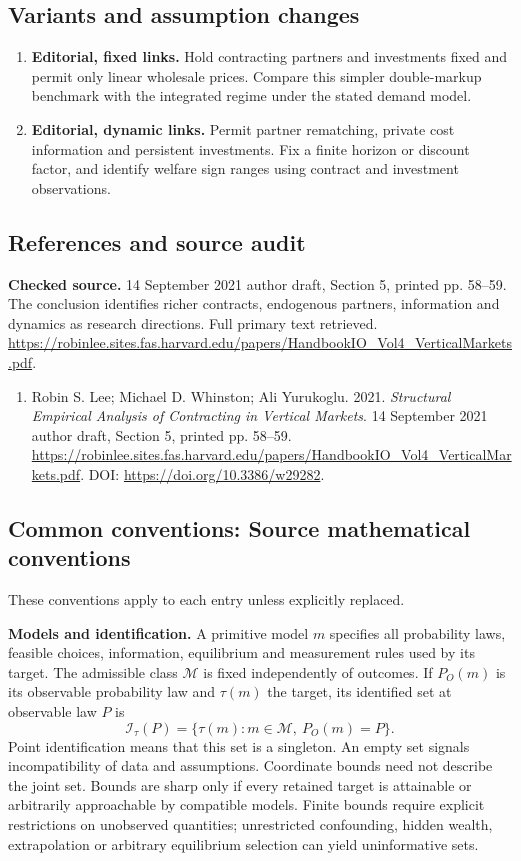 \documentclass[11pt,a4paper]{article}
\begin{document}
\subsection*{Variants and assumption changes}
\begin{enumerate}
\item \textbf{Editorial, fixed links.} Hold contracting partners and investments fixed and permit only linear wholesale prices. Compare this simpler double-markup benchmark with the integrated regime under the stated demand model.
\item \textbf{Editorial, dynamic links.} Permit partner rematching, private cost information and persistent investments. Fix a finite horizon or discount factor, and identify welfare sign ranges using contract and investment observations.
\end{enumerate}
\subsection*{References and source audit}
\textbf{Checked source.} 14 September 2021 author draft, Section 5, printed pp. 58--59. The conclusion identifies richer contracts, endogenous partners, information and dynamics as research directions. Full primary text retrieved. \url{https://robinlee.sites.fas.harvard.edu/papers/HandbookIO_Vol4_VerticalMarkets.pdf}.
\begin{enumerate}\raggedright
\item\hypertarget{definitions:source:30007678:1}{} Robin S. Lee; Michael D. Whinston; Ali Yurukoglu. 2021. \emph{Structural Empirical Analysis of Contracting in Vertical Markets}. 14 September 2021 author draft, Section 5, printed pp. 58--59.
\url{https://robinlee.sites.fas.harvard.edu/papers/HandbookIO_Vol4_VerticalMarkets.pdf}.
DOI: \url{https://doi.org/10.3386/w29282}.
\end{enumerate}

\subsection*{Common conventions: Source mathematical conventions}

These conventions apply to each entry unless explicitly replaced.

\textbf{Models and identification.} A primitive model \(m\) specifies all probability laws, feasible choices, information, equilibrium and measurement rules used by its target. The admissible class \(\mathcal M\) is fixed independently of outcomes. If \(P_O(m)\) is its observable probability law and \(\tau(m)\) the target, its identified set at observable law \(P\) is
\[
 \mathcal I_\tau(P)=\{\tau(m):m\in\mathcal M,\ P_O(m)=P\}.
\]
Point identification means that this set is a singleton. An empty set signals incompatibility of data and assumptions. Coordinate bounds need not describe the joint set. Bounds are sharp only if every retained target is attainable or arbitrarily approachable by compatible models. Finite bounds require explicit restrictions on unobserved quantities; unrestricted confounding, hidden wealth, extrapolation or arbitrary equilibrium selection can yield uninformative sets.
\end{document}
